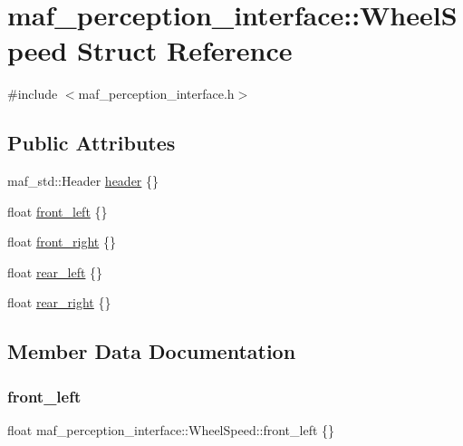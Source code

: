 \hypertarget{structmaf__perception__interface_1_1WheelSpeed}{}\section{maf\+\_\+perception\+\_\+interface\+:\+:Wheel\+Speed Struct Reference}
\label{structmaf__perception__interface_1_1WheelSpeed}


{\ttfamily \#include $<$maf\+\_\+perception\+\_\+interface.\+h$>$}

\subsection*{Public Attributes}
\begin{DoxyCompactItemize}
\item 
maf\+\_\+std\+::\+Header \hyperlink{structmaf__perception__interface_1_1WheelSpeed_ad94fe29169d6ab20f8b73d1e06374190}{header} \{\}
\item 
float \hyperlink{structmaf__perception__interface_1_1WheelSpeed_ac0f162776c5300d84f23014314a4bf0b}{front\+\_\+left} \{\}
\item 
float \hyperlink{structmaf__perception__interface_1_1WheelSpeed_ad45a25504b45346c87afef9f01763ff8}{front\+\_\+right} \{\}
\item 
float \hyperlink{structmaf__perception__interface_1_1WheelSpeed_a7bb1e1d3881439b602f37c8dfed2fd74}{rear\+\_\+left} \{\}
\item 
float \hyperlink{structmaf__perception__interface_1_1WheelSpeed_ab5307c69e485e62de5bb7894c5b342c2}{rear\+\_\+right} \{\}
\end{DoxyCompactItemize}


\subsection{Member Data Documentation}
\mbox{\label{structmaf__perception__interface_1_1WheelSpeed_ac0f162776c5300d84f23014314a4bf0b}} 
\subsubsection{\texorpdfstring{front\+\_\+left}{front\_left}}
{\footnotesize\ttfamily float maf\+\_\+perception\+\_\+interface\+::\+Wheel\+Speed\+::front\+\_\+left \{\}}


